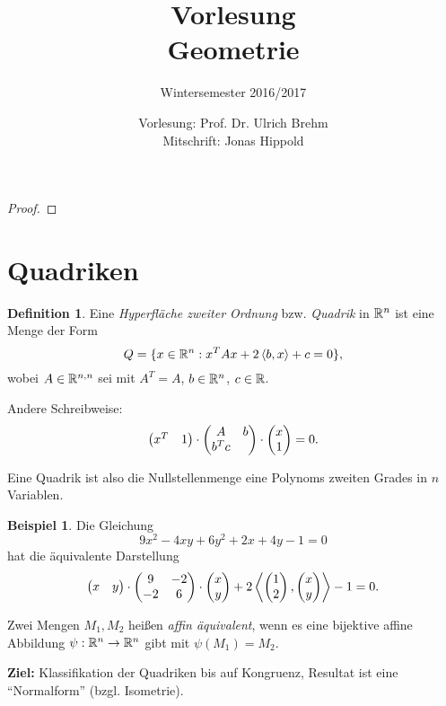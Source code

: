 \documentclass[
 a4paper,
 12pt,
 parskip=half
 ]{scrartcl}
\title{Vorlesung\\Geometrie}
\subtitle{Wintersemester 2016/2017}
\author{Vorlesung: Prof. Dr. Ulrich Brehm\\Mitschrift: Jonas Hippold}
\theoremstyle{plain}
\theoremstyle{definition}
\newtheorem*{exmp*}{Beispiel}
\newtheorem*{defn*}{Definition}
\begin{document}
\maketitle

\tableofcontents

\clearpage

\setcounter{secnumdepth}{0}
% 

\clearpage


\clearpage


\clearpage


\clearpage


\begin{proof}
\end{proof}

\clearpage
\setcounter{secnumdepth}{1}
\section{Quadriken}
\setcounter{secnumdepth}{0}
\begin{defn*}
  Eine \emph{Hyperfläche zweiter Ordnung} bzw. \emph{Quadrik} in $\mathbb{R}^n$ ist
  eine Menge der Form
  \[ Q = \{ x \in \mathbb{R}^n : x^T A x + 2 \left\langle b,x \right\rangle + c = 0\}, \]
  wobei $A \in \mathbb{R}^{n,n}$ sei mit $A^T = A$, $b \in \mathbb{R}^n$, $c \in \mathbb{R}$.

  Andere Schreibweise:
  \[ \begin{pmatrix}x^T & 1\end{pmatrix} \cdot \begin{pmatrix}A & b \\ b^T c\end{pmatrix} \cdot \begin{pmatrix}x\\1\end{pmatrix} = 0. \]
\end{defn*}

Eine Quadrik ist also die Nullstellenmenge eine Polynoms zweiten Grades in $n$
Variablen.

\begin{exmp*}
  Die Gleichung
  \[ 9x^2 - 4 xy + 6 y^2 + 2x + 4y - 1 = 0 \]
  hat die äquivalente Darstellung
  \[ \begin{pmatrix}x & y\end{pmatrix} \cdot \begin{pmatrix}9 & -2 \\ -2 & 6\end{pmatrix} \cdot \begin{pmatrix}x\\y\end{pmatrix} + 2
    \left\langle \begin{pmatrix}1\\2\end{pmatrix},\begin{pmatrix}x\\y\end{pmatrix} \right\rangle - 1  = 0. \]
\end{exmp*}

Zwei Mengen $M_1, M_2$ heißen \emph{affin äquivalent}, wenn es eine bijektive
affine Abbildung $\psi: \mathbb{R}^n \to \mathbb{R}^n$ gibt mit $\psi(M_1) = M_2$.

\textbf{Ziel:} Klassifikation der Quadriken bis auf Kongruenz, Resultat ist eine
``Normalform'' (bzgl. Isometrie).
\end{document}
